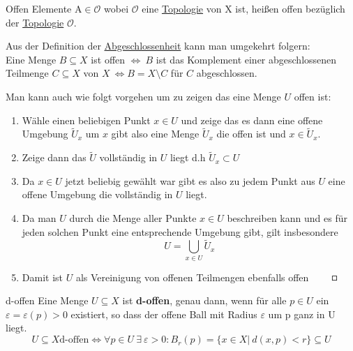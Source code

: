 \begin{titleDef}{Offen}
\label{offen}
Elemente $\mathrm{A}\in\mathcal{O}$ wobei $\mathcal{O}$ eine \hyperref[Topologie]{Topologie} von X ist, heißen offen bezüglich der \hyperref[Topologie]{Topologie} $\mathcal{O}$.\par
Aus der Definition der \hyperref[abgeschlossen]{Abgeschlossenheit} kann man umgekehrt folgern:\\
Eine Menge $B\subseteq X$ ist offen $\Leftrightarrow\ B$ ist das Komplement einer abgeschlossenen Teilmenge $C\subseteq X$ von $X\:\Leftrightarrow B=X\setminus C$ für $C$ abgeschlossen.\par
Man kann auch wie folgt vorgehen um zu zeigen das eine Menge $U$ offen ist:
\begin{enumerate}
	\item Wähle einen beliebigen Punkt $x\in U$ und zeige das es dann eine offene Umgebung $\widetilde{U}_x$ um $x$ gibt also eine Menge $\widetilde{U}_x$ die offen ist und $x\in\tilde{U}_x$.
	\item Zeige dann das $\widetilde{U}$ vollständig in $U$ liegt d.h $\widetilde{U}_x\subset U$
	\item Da $x\in U$ jetzt beliebig gewählt war gibt es also zu jedem Punkt aus $U$ eine offene Umgebung die vollständig in $U$ liegt.
	\item Da man $U$ durch die Menge aller Punkte $x\in U$ beschreiben kann und es für jeden solchen Punkt eine entsprechende Umgebung gibt, gilt insbesondere
	$$U=\bigcup_{x\in U}\widetilde{U}_x$$
	\item Damit ist $U$ als Vereinigung von offenen Teilmengen ebenfalls offen $\qed$
\end{enumerate}
\end{titleDef}

\begin{titleDef}{d-offen}
\label{doffen}
Eine Menge $U\subseteq X$ ist \textbf{d-offen}, genau dann, wenn für alle $p\in U$ ein $\varepsilon=\varepsilon(p)>0$ existiert, so dass der offene Ball mit Radius $\varepsilon$ um p ganz in U liegt.
$$U\subseteq X \text{d-offen}\Leftrightarrow\forall p\in U\ \exists\ \varepsilon>0:B_r(p)=\{x\in X|\ d(x,p)<r\}\subseteq U$$
\end{titleDef}

